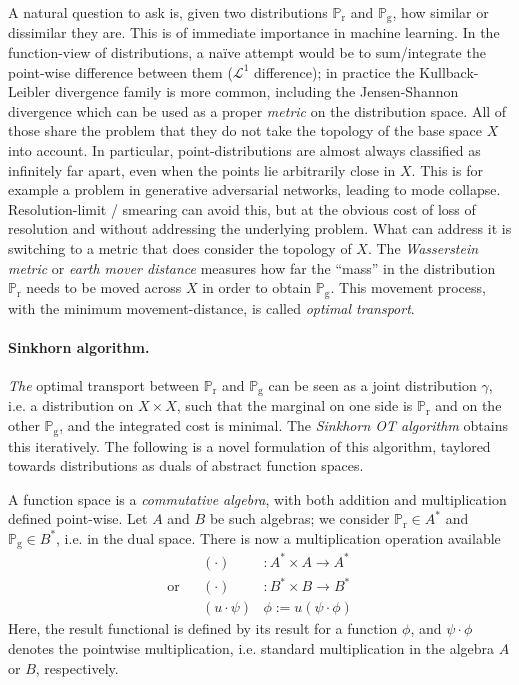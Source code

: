 \documentclass[a4paper]{easychair}
\begin{document}
\newcommand{\marg}[1]{\mathbb{P}_\mathrm{#1}}
A natural question to ask is, given two distributions $\marg r$ and $\marg g$, how similar or dissimilar they are. This is of immediate importance in machine learning. In the function-view of distributions, a naïve attempt would be to sum/integrate the point-wise difference between them ($\mathcal{L}^1$ difference); in practice the Kullback-Leibler \cite{Kullback_1951} divergence family is more common, including the Jensen-Shannon divergence which can be used as a proper \emph{metric} on the distribution space.
 All of those share the problem that they do not take the topology of the base space $X$ into account. In particular, point-distributions are almost always classified as infinitely far apart, even when the points lie arbitrarily close in $X$. This is for example a problem in generative adversarial networks, leading to mode collapse. Resolution-limit / smearing can avoid this, but at the obvious cost of loss of resolution and without addressing the underlying problem.
What can address it \cite{pmlr-v70-arjovsky17a} is switching to a metric that does consider the topology of $X$. The \emph{Wasserstein metric} or \emph{earth mover distance} measures how far the “mass” in the distribution $\marg r$ needs to be moved across $X$ in order to obtain $\marg g$. This movement process, with the minimum movement-distance, is called \emph{optimal transport}.

\paragraph{Sinkhorn algorithm.} \emph{The} optimal transport between $\marg r$ and $\marg g$ can be seen as a joint distribution $\gamma$, i.e. a distribution on $X\times X$, such that the marginal on one side is $\marg r$ and on the other $\marg g$, and the integrated cost is minimal.
The \emph{Sinkhorn OT algorithm} \cite{CuturiSinkhornLightspeed} obtains this iteratively. The following is a novel formulation of this algorithm, taylored towards distributions as duals of abstract function spaces.

A function space is a \emph{commutative algebra}, with both addition and multiplication defined point-wise. Let $A$ and $B$ be such algebras; we consider $\marg r \in A^\ast$ and $\marg g \in B^\ast$, i.e. in the dual space. There is now a multiplication operation available
\[\begin{aligned}
            && (\cdot) &: A^\ast \times A \to A^\ast
 \\\text{or}&& (\cdot) &: B^\ast \times B \to B^\ast
 \\         && (u\cdot\psi)& \phi := u(\psi\cdot\phi)
\end{aligned}\]
Here, the result functional is defined by its result for a function $\phi$, and $\psi\cdot\phi$ denotes the pointwise multiplication, i.e. standard multiplication in the algebra $A$ or $B$, respectively.
\end{document}

